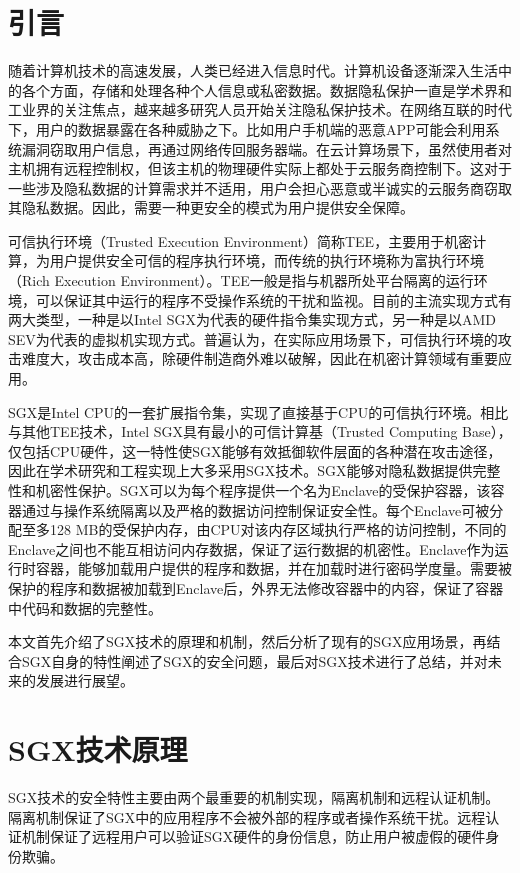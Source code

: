 \documentclass{source/Paper}
\date{\today}
\begin{document}
    \makeheader
    \section{引言}
    随着计算机技术的高速发展，人类已经进入信息时代。计算机设备逐渐深入生活中的各个方面，存储和处理各种个人信息或私密数据。数据隐私保护一直是学术界和工业界的关注焦点，越来越多研究人员开始关注隐私保护技术。在网络互联的时代下，用户的数据暴露在各种威胁之下。比如用户手机端的恶意APP可能会利用系统漏洞窃取用户信息，再通过网络传回服务器端。在云计算场景下，虽然使用者对主机拥有远程控制权，但该主机的物理硬件实际上都处于云服务商控制下。这对于一些涉及隐私数据的计算需求并不适用，用户会担心恶意或半诚实的云服务商窃取其隐私数据。因此，需要一种更安全的模式为用户提供安全保障。

    可信执行环境（Trusted Execution Environment）简称TEE，主要用于机密计算，为用户提供安全可信的程序执行环境，而传统的执行环境称为富执行环境（Rich Execution Environment）。TEE一般是指与机器所处平台隔离的运行环境，可以保证其中运行的程序不受操作系统的干扰和监视。目前的主流实现方式有两大类型，一种是以Intel SGX为代表的硬件指令集实现方式，另一种是以AMD SEV为代表的虚拟机实现方式。普遍认为，在实际应用场景下，可信执行环境的攻击难度大，攻击成本高，除硬件制造商外难以破解，因此在机密计算领域有重要应用。

    SGX是Intel CPU的一套扩展指令集，实现了直接基于CPU的可信执行环境。相比与其他TEE技术，Intel SGX具有最小的可信计算基（Trusted Computing Base），仅包括CPU硬件，这一特性使SGX能够有效抵御软件层面的各种潜在攻击途径，因此在学术研究和工程实现上大多采用SGX技术。SGX能够对隐私数据提供完整性和机密性保护。SGX可以为每个程序提供一个名为Enclave的受保护容器，该容器通过与操作系统隔离以及严格的数据访问控制保证安全性。每个Enclave可被分配至多128 MB的受保护内存，由CPU对该内存区域执行严格的访问控制，不同的Enclave之间也不能互相访问内存数据，保证了运行数据的机密性。Enclave作为运行时容器，能够加载用户提供的程序和数据，并在加载时进行密码学度量。需要被保护的程序和数据被加载到Enclave后，外界无法修改容器中的内容，保证了容器中代码和数据的完整性。




    本文首先介绍了SGX技术的原理和机制，然后分析了现有的SGX应用场景，再结合SGX自身的特性阐述了SGX的安全问题，最后对SGX技术进行了总结，并对未来的发展进行展望。


    \section{SGX技术原理}
    SGX技术的安全特性主要由两个最重要的机制实现，隔离机制和远程认证机制。隔离机制保证了SGX中的应用程序不会被外部的程序或者操作系统干扰。远程认证机制保证了远程用户可以验证SGX硬件的身份信息，防止用户被虚假的硬件身份欺骗。
    
\end{document}
